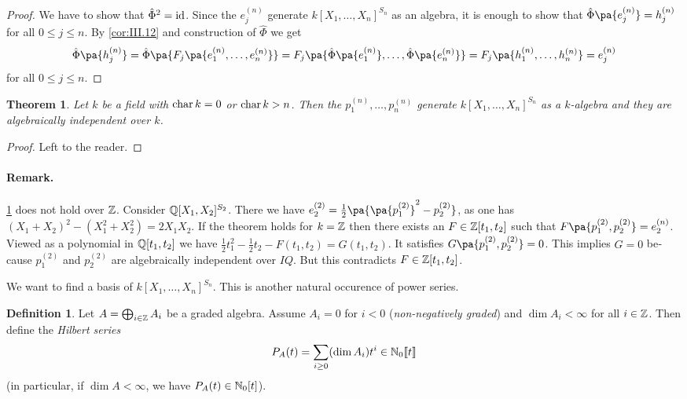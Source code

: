 \documentclass[12pt,a4paper]{scrartcl}
\theoremstyle{cplain}
\theoremstyle{cplain}
\newtheorem{thm}[thmcounter]{Theorem}
\theoremstyle{cplain}
\theoremstyle{definition}
\newtheorem*{deff}{Definition}
\begin{document}
\begin{otherlanguage}{english}
\begin{proof}
  We have to show that ${\hat\Phi}^2 = \operatorname{id}$. Since the $e_j^{(n)}$ generate $k[X_1,\ldots,X_n]^{S_n}$ as an algebra, it is enough to show that $\hat\Phi\pa{e_j^{(n)}} = h_j^{(n)}$ for all $0 \le j \le n$. By \cref{cor:III.12} and construction of $\hat\Phi$ we get \[ \hat\Phi\pa{h_j^{(n)}} = \hat\Phi\pa{F_j\pa{e_1^{(n)},\ldots,e_n^{(n)}}} = F_j\pa{\hat\Phi\pa{e_1^{(n)}},\ldots,\hat\Phi\pa{e_n^{(n)}}} = F_j\pa{h_1^{(n)},\ldots,h_n^{(n)}} = e_j^{(n)} \] for all $0 \le j \le n$.
\end{proof}

\begin{thm} \label{thm:III.14}
  Let $k$ be a field with $\operatorname{char} k=0$ or $\operatorname{char} k>n$. Then the $p_1^{(n)},\ldots,p_n^{(n)}$ generate $k[X_1,\ldots,X_n]^{S_n}$ as a $k$-algebra and they are algebraically independent over $k$.
\end{thm}
\begin{proof}
  Left to the reader.
\end{proof}

\paragraph{Remark.}
\cref{thm:III.14} does not hold over $\mathbb Z$. Consider $\mathbb Q[X_1,X_2]^{S_2}$. There we have $e_2^{(2)} = \frac12\pa{\pa{p_1^{(2)}}^2-p_2^{(2)}}$, as one has $(X_1+X_2)^2 - (X_1^2 + X_2^2) = 2X_1X_2$. If the theorem holds for $k=\mathbb Z$ then there exists an $F \in \mathbb Z[t_1,t_2]$ such that $F\pa{p_1^{(2)},p_2^{(2)}} = e_2^{(n)}$. Viewed as a polynomial in $\mathbb Q[t_1,t_2]$ we have $\frac12t_1^2-\frac12t_2-F(t_1,t_2) = G(t_1,t_2)$. It satisfies $G\pa{p_1^{(2)},p_2^{(2)}} = 0$. This implies $G = 0$ because $p_1^{(2)}$ and $p_2^{(2)}$ are algebraically independent over $IQ$. But this contradicts $F \in \mathbb Z[t_1,t_2]$.

\bigskip

We want to find a basis of $k[X_1,\ldots,X_n]^{S_n}$. This is another natural occurence of power series.

\begin{deff}
  Let $A = \bigoplus_{i\in\mathbb Z}A_i$ be a graded algebra. Assume $A_i = 0$ for $i<0$ (\emph{non-negatively graded}) and $\dim A_i <\infty$ for all $i \in \mathbb Z$. Then define the \emph{Hilbert series} \[ P_A(t) = \sum_{i\ge 0} (\dim A_i)t^i \in \mathbb N_0\llbracket t \rrbracket \] (in particular, if $\dim A < \infty$, we have $P_A(t) \in \mathbb N_0[t]$).
\end{deff}


\end{otherlanguage}
\end{document}
